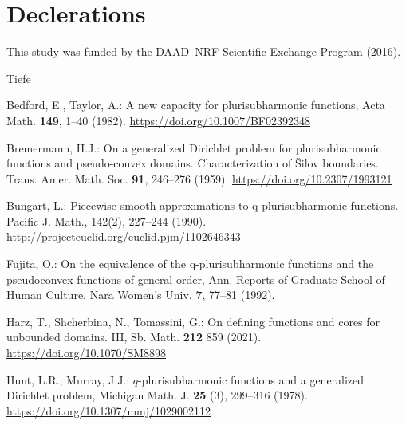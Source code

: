 \documentclass[reqno]{amsart}
\theoremstyle{definition}
\numberwithin{equation}{section}
\begin{document}
\section*{Declerations}

This study was funded by the DAAD–NRF Scientific Exchange Program (2016). 




\begin{thebibliography}{Tiefe}


Bedford, E., Taylor, A.: A new capacity for plurisubharmonic functions, Acta Math. \textbf{149}, 1--40 (1982). \href{https://api.semanticscholar.org/CorpusID:123003061}{https://doi.org/10.1007/BF02392348}

 Bremermann, H.J.: On a generalized Dirichlet problem for plurisubharmonic functions and pseudo-convex domains. Characterization of \v{S}ilov boundaries. Trans. Amer. Math. Soc. \textbf{91}, 246--276 (1959). \href{https://doi.org/10.2307/1993121}{https://doi.org/10.2307/1993121}

Bungart, L.: Piecewise smooth approximations to q-plurisubharmonic functions. Pacific J. Math., 142(2), 227--244 (1990). \href{http://projecteuclid.org/euclid.pjm/1102646343}{http://projecteuclid.org/euclid.pjm/1102646343}

Fujita, O.: On the equivalence of the q-plurisubharmonic functions and the pseudoconvex functions of general order, Ann. Reports of Graduate School of Human Culture, Nara Women's  Univ. \textbf{7}, 77--81 (1992). 

Harz, T., Shcherbina, N., Tomassini, G.: On defining functions and cores for unbounded domains. III, Sb. Math. \textbf{212} 859 (2021). \href{https://doi.org/10.1070/SM8898}{https://doi.org/10.1070/SM8898}


Hunt, L.R., Murray, J.J.: $q$-plurisubharmonic functions and a generalized Dirichlet problem, Michigan Math. J. \textbf{25} (3), 299--316 (1978). \href{https://doi.org/10.1307/mmj/1029002112}{https://doi.org/10.1307/mmj/1029002112}


\end{thebibliography}
\end{document}
